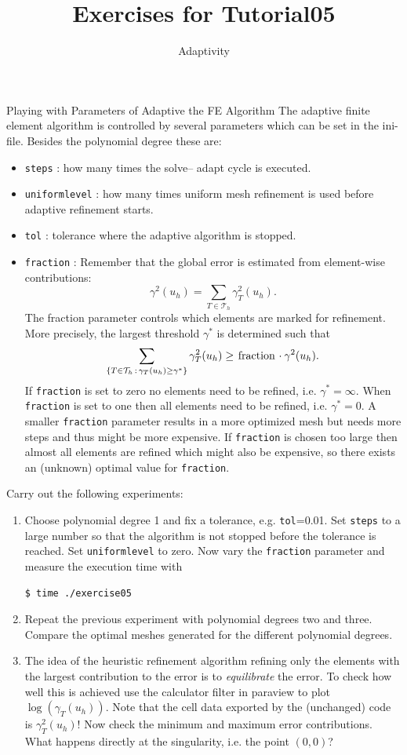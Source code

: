 \documentclass[12pt,a4paper]{article}
\title{\textbf{Exercises for Tutorial05}}
\subtitle{Adaptivity}
\begin{document}
\exerciseheader

\begin{Exercise}{Playing with Parameters of Adaptive the FE Algorithm}
The adaptive finite element algorithm is controlled by several parameters
which can be set in the ini-file.
Besides the polynomial degree these are:
\begin{itemize}
\item \lstinline{steps} : how many times the solve-- adapt cycle is executed.
\item \lstinline{uniformlevel} : how many times uniform mesh refinement is used before
adaptive refinement starts.
\item \lstinline{tol} : tolerance where the adaptive algorithm is stopped.
\item \lstinline{fraction} : Remember that the global error is estimated from element-wise
contributions: $$\gamma^2(u_h) = \sum_{T\in \mathcal{T}_h} \gamma_T^2(u_h).$$
The fraction parameter controls which elements are marked for refinement. More precisely,
the largest threshold $\gamma^\ast$ is determined such that
$$\sum_{\{T\in\mathcal{T}_h \,:\, \gamma_T(u_h)\geq\gamma^\ast\}} \gamma_T^2(u_h)
\geq \text{\lstinline{fraction}} \cdot \gamma^2(u_h). $$
If \lstinline{fraction} is set to zero no elements need to be refined, i.e. $\gamma^\ast=\infty$.
When \lstinline{fraction} is set to one then all elements need to be refined, i.e. $\gamma^\ast=0$.
A smaller \lstinline{fraction} parameter results in a more optimized mesh but needs more steps
and thus might be more expensive. If \lstinline{fraction} is chosen too large then almost
all elements are refined which might also be expensive, so there exists an (unknown) optimal
value for \lstinline{fraction}.
\end{itemize}
Carry out the following experiments:
\begin{enumerate}
\item Choose polynomial degree 1 and fix a tolerance, e.g. \lstinline{tol}=0.01.
Set \lstinline{steps} to a large number so that the algorithm is not stopped before the
tolerance is reached. Set \lstinline{uniformlevel} to zero. Now vary the \lstinline{fraction} parameter
and measure the execution time with
\begin{lstlisting}[basicstyle=\ttfamily\small,
frame=single,
backgroundcolor=\color{listingbg}]
$ time ./exercise05
\end{lstlisting}
\item Repeat the previous experiment with polynomial degrees two and three. Compare the optimal
meshes generated for the different polynomial degrees.
\item The idea of the heuristic refinement algorithm refining only the elements with the
largest contribution to the error is to \textit{equilibrate} the error. To check how well this
is achieved use the calculator filter in paraview to plot $\log(\gamma_T(u_h))$. Note that
the cell data exported by the (unchanged) code is $\gamma_T^2(u_h)$! Now check
the minimum and maximum error contributions. What happens directly at the singularity,
i.e. the point $(0,0)$?
\end{enumerate}
\end{Exercise}
\end{document}
